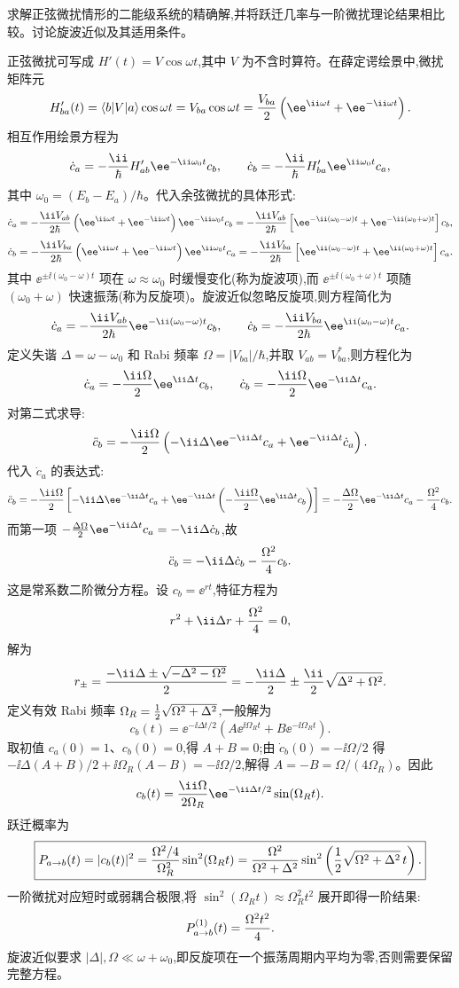 \begin{question}
求解正弦微扰情形的二能级系统的精确解,并将跃迁几率与一阶微扰理论结果相比较。讨论旋波近似及其适用条件。
\begin{solution}
正弦微扰可写成 $H'(t)=V\cos\omega t$,其中 $V$ 为不含时算符。在薛定谔绘景中,微扰矩阵元
\[
H'_{ba}(t)=\langle b|V|a\rangle\cos\omega t
=V_{ba}\cos\omega t={V_{ba}\over2}\left(\ee^{\ii\omega t}+\ee^{-\ii\omega t}\right).
\]
相互作用绘景方程为
\[
\dot c_a=-{\ii\over\hbar}H'_{ab}\ee^{-\ii\omega_0t}c_b,\qquad
\dot c_b=-{\ii\over\hbar}H'_{ba}\ee^{\ii\omega_0t}c_a,
\]
其中 $\omega_0=(E_b-E_a)/\hbar$。代入余弦微扰的具体形式:
\[
\dot c_a=-{\ii V_{ab}\over2\hbar}\left(\ee^{\ii\omega t}+\ee^{-\ii\omega t}\right)\ee^{-\ii\omega_0t}c_b
=-{\ii V_{ab}\over2\hbar}\left[\ee^{-\ii(\omega_0-\omega)t}+\ee^{-\ii(\omega_0+\omega)t}\right]c_b,
\]
\[
\dot c_b=-{\ii V_{ba}\over2\hbar}\left(\ee^{\ii\omega t}+\ee^{-\ii\omega t}\right)\ee^{\ii\omega_0t}c_a
=-{\ii V_{ba}\over2\hbar}\left[\ee^{\ii(\omega_0-\omega)t}+\ee^{\ii(\omega_0+\omega)t}\right]c_a.
\]
其中 $\ee^{\pm\ii(\omega_0-\omega)t}$ 项在 $\omega\approx\omega_0$ 时缓慢变化(称为旋波项),而 $\ee^{\pm\ii(\omega_0+\omega)t}$ 项随 $(\omega_0+\omega)$ 快速振荡(称为反旋项)。旋波近似忽略反旋项,则方程简化为
\[
\dot c_a=-{\ii V_{ab}\over2\hbar}\ee^{-\ii(\omega_0-\omega)t}c_b,\qquad
\dot c_b=-{\ii V_{ba}\over2\hbar}\ee^{\ii(\omega_0-\omega)t}c_a.
\]
定义失谐 $\Delta=\omega-\omega_0$ 和 Rabi 频率 $\Omega=|V_{ba}|/\hbar$,并取 $V_{ab}=V_{ba}^*$,则方程化为
\[
\dot c_a=-{\ii\Omega\over2}\ee^{\ii\Delta t}c_b,\qquad
\dot c_b=-{\ii\Omega\over2}\ee^{-\ii\Delta t}c_a.
\]
对第二式求导:
\[
\ddot c_b=-{\ii\Omega\over2}\left(-\ii\Delta \ee^{-\ii\Delta t}c_a+\ee^{-\ii\Delta t}\dot c_a\right).
\]
代入 $\dot c_a$ 的表达式:
\[
\ddot c_b=-{\ii\Omega\over2}\left[-\ii\Delta \ee^{-\ii\Delta t}c_a
+\ee^{-\ii\Delta t}\left(-{\ii\Omega\over2}\ee^{\ii\Delta t}c_b\right)\right]
=-{\Delta\Omega\over2}\ee^{-\ii\Delta t}c_a-{\Omega^2\over4}c_b.
\]
而第一项 $-{\Delta\Omega\over2}\ee^{-\ii\Delta t}c_a=-\ii\Delta\dot c_b$,故
\[
\ddot c_b=-\ii\Delta\dot c_b-{\Omega^2\over4}c_b.
\]
这是常系数二阶微分方程。设 $c_b=\ee^{rt}$,特征方程为
\[
r^2+\ii\Delta r+{\Omega^2\over4}=0,
\]
解为
\[
r_\pm={-\ii\Delta\pm\sqrt{-\Delta^2-\Omega^2}\over2}
=-{\ii\Delta\over2}\pm{\ii\over2}\sqrt{\Delta^2+\Omega^2}.
\]
定义有效 Rabi 频率 $\Omega_R={1\over2}\sqrt{\Omega^2+\Delta^2}$,一般解为
\[
c_b(t)=\ee^{-\ii\Delta t/2}\left(A \ee^{\ii\Omega_R t}+B \ee^{-\ii\Omega_R t}\right).
\]
取初值 $c_a(0)=1$、$c_b(0)=0$,得 $A+B=0$;由 $\dot c_b(0)=-\ii\Omega/2$ 得 $-\ii\Delta(A+B)/2+\ii\Omega_R(A-B)=-\ii\Omega/2$,解得 $A=-B=\Omega/(4\Omega_R)$。因此
\[
c_b(t)={\ii\Omega\over2\Omega_R}\ee^{-\ii\Delta t/2}\sin(\Omega_R t).
\]
跃迁概率为
\[
\boxed{P_{a\to b}(t)=|c_b(t)|^2={\Omega^2/4\over\Omega_R^2}\sin^2(\Omega_R t)
={\Omega^2\over\Omega^2+\Delta^2}
\sin^2\left({1\over2}\sqrt{\Omega^2+\Delta^2}\,t\right).}
\]
一阶微扰对应短时或弱耦合极限,将 $\sin^2(\Omega_R t)\approx\Omega_R^2 t^2$ 展开即得一阶结果:
\[
P_{a\to b}^{(1)}(t)={\Omega^2 t^2\over4}.
\]
旋波近似要求 $|\Delta|,\Omega\ll\omega+\omega_0$,即反旋项在一个振荡周期内平均为零,否则需要保留完整方程。
\end{solution}
\end{question}

